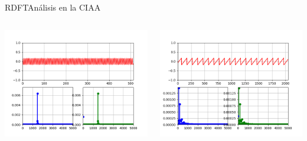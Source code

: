 \begin{frame}[c]{RDFT}{Análisis en la CIAA}
   \protoboardicon
   \begin{columns}[c]
      \begin{column}{.5\textwidth}
         \includegraphics[width=1.0\textwidth]{3_clase/dft_ciaa1}
      \end{column}
      \begin{column}{.5\textwidth}
         \includegraphics[width=1.0\textwidth]{3_clase/dft_ciaa2}
      \end{column}
   \end{columns}
   \vfill
\end{frame}
